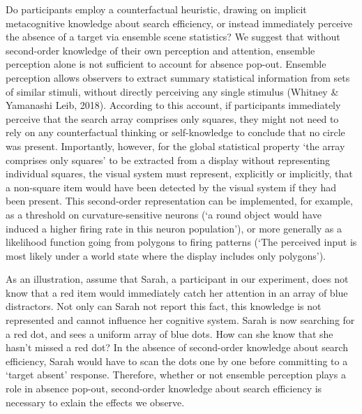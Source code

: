 \documentclass[12pt,twoside]{reedthesis}
\begin{document}
Do participants employ a counterfactual heuristic, drawing on implicit metacognitive knowledge about search efficiency, or instead immediately perceive the absence of a target via ensemble scene statistics? We suggest that without second-order knowledge of their own perception and attention, ensemble perception alone is not sufficient to account for absence pop-out. Ensemble perception allows observers to extract summary statistical information from sets of similar stimuli, without directly perceiving any single stimulus (Whitney \& Yamanashi Leib, 2018). According to this account, if participants immediately perceive that the search array comprises only squares, they might not need to rely on any counterfactual thinking or self-knowledge to conclude that no circle was present. Importantly, however, for the global statistical property `the array comprises only squares' to be extracted from a display without representing individual squares, the visual system must represent, explicitly or implicitly, that a non-square item would have been detected by the visual system if they had been present. This second-order representation can be implemented, for example, as a threshold on curvature-sensitive neurons (`a round object would have induced a higher firing rate in this neuron population'), or more generally as a likelihood function going from polygons to firing patterns (`The perceived input is most likely under a world state where the display includes only polygons').

As an illustration, assume that Sarah, a participant in our experiment, does not know that a red item would immediately catch her attention in an array of blue distractors. Not only can Sarah not report this fact, this knowledge is not represented and cannot influence her cognitive system. Sarah is now searching for a red dot, and sees a uniform array of blue dots. How can she know that she hasn't missed a red dot? In the absence of second-order knowledge about search efficiency, Sarah would have to scan the dots one by one before committing to a `target absent' response. Therefore, whether or not ensemble perception plays a role in absence pop-out, second-order knowledge about search efficiency is necessary to exlain the effects we observe.
\end{document}
